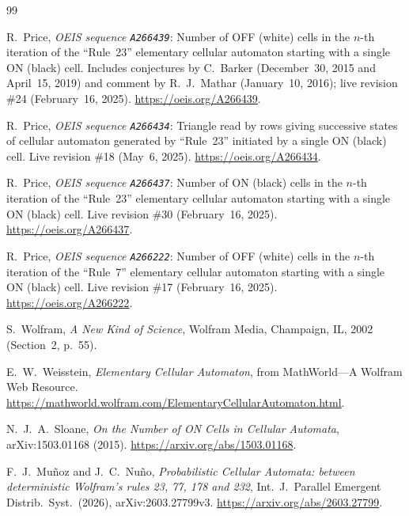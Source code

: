 \documentclass[11pt]{article}
\theoremstyle{definition}
\newcommand{\seq}[1]{\texttt{#1}}
\begin{document}
{\small
\begin{thebibliography}{99}\setlength{\itemsep}{2pt}
\raggedright

R.\ Price, \emph{OEIS sequence \seq{A266439}}: Number of OFF (white) cells in the $n$-th iteration of the ``Rule~23'' elementary cellular automaton starting with a single ON (black) cell. Includes conjectures by C.\ Barker (December~30, 2015 and April~15, 2019) and comment by R.~J.\ Mathar (January~10, 2016); live revision \#24 (February~16, 2025). \url{https://oeis.org/A266439}.

R.\ Price, \emph{OEIS sequence \seq{A266434}}: Triangle read by rows giving successive states of cellular automaton generated by ``Rule~23'' initiated by a single ON (black) cell. Live revision \#18 (May~6, 2025). \url{https://oeis.org/A266434}.

R.\ Price, \emph{OEIS sequence \seq{A266437}}: Number of ON (black) cells in the $n$-th iteration of the ``Rule~23'' elementary cellular automaton starting with a single ON (black) cell. Live revision \#30 (February~16, 2025). \url{https://oeis.org/A266437}.

R.\ Price, \emph{OEIS sequence \seq{A266222}}: Number of OFF (white) cells in the $n$-th iteration of the ``Rule~7'' elementary cellular automaton starting with a single ON (black) cell. Live revision \#17 (February~16, 2025). \url{https://oeis.org/A266222}.

S.\ Wolfram, \emph{A New Kind of Science}, Wolfram Media, Champaign, IL, 2002 (Section~2, p.~55).

E.~W.\ Weisstein, \emph{Elementary Cellular Automaton}, from MathWorld---A Wolfram Web Resource. \url{https://mathworld.wolfram.com/ElementaryCellularAutomaton.html}.

N.~J.~A.\ Sloane, \emph{On the Number of ON Cells in Cellular Automata}, arXiv:1503.01168 (2015). \url{https://arxiv.org/abs/1503.01168}.

F.~J.\ Mu\~noz and J.~C.\ Nu\~no, \emph{Probabilistic Cellular Automata: between deterministic Wolfram's rules 23, 77, 178 and 232}, Int.\ J.\ Parallel Emergent Distrib.\ Syst.\ (2026), arXiv:2603.27799v3. \url{https://arxiv.org/abs/2603.27799}.

\end{thebibliography}
}
\end{document}
